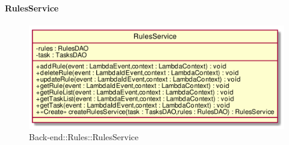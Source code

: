 \hypertarget{RulesService_label}{\paragraph{RulesService}}
\begin{figure}[h]
	\centering
	\includegraphics[width=\textwidth,height=\textheight,keepaspectratio]{images/ClassRulesService.png}
	\caption{Back-end::Rules::RulesService}
\end{figure}
